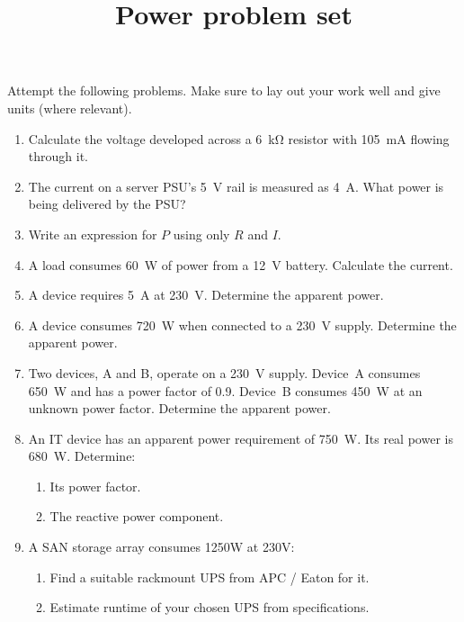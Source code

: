 \documentclass{pgnotes}
\title{Power problem set}
\begin{document}
\maketitle

Attempt the following problems.
Make sure to lay out your work well and give units (where relevant).

\begin{enumerate}

\item Calculate the voltage developed across a \SI{6}{\kilo\ohm} resistor with \SI{105}{\milli\ampere} flowing through it.

\item The current on a server PSU's \SI{5}{\volt} rail is measured as \SI{4}{\ampere}. What power is being delivered by the PSU?

\item Write an expression for $P$ using only $R$ and $I$.

\item A load consumes \SI{60}{\watt} of power from a \SI{12}{\volt} battery.  Calculate the current.
  
\item
  A device requires \SI{5}{\ampere} at \SI{230}{\volt}. Determine the apparent power.

\item
  A device consumes \SI{720}{\watt} when connected to a \SI{230}{\volt} supply. Determine the apparent power.

\item
  Two devices, A and B, operate on a \SI{230}{\volt} supply.
  Device~A consumes \SI{650}{\watt} and has a power factor of 0.9.
  Device~B consumes \SI{450}{\watt} at an unknown power factor.
  Determine the apparent power.

\item
  An IT device has an apparent power requirement of \SI{750}{\watt}.
  Its real power is \SI{680}{\watt}.
  Determine:
  \begin{enumerate}
  \item Its power factor.
  \item The reactive power component.
  \end{enumerate}

\item 
  A SAN storage array consumes 1250W at 230V:
  \begin{enumerate}
  \item Find a suitable rackmount UPS from APC / Eaton for it.
  \item Estimate runtime of your chosen UPS from specifications.
  \end{enumerate}


\end{enumerate}
\end{document}
